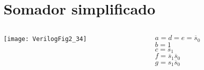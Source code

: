 \section{Somador simplificado} %


\begin{frame}{\insertsection}   \centering
        \begin{columns}
        \begin{column}{0.65\textwidth}
            \texttt{[image: VerilogFig2\_34]}
        \end{column}        
        \begin{column}{0.35\textwidth}
            \pause
            $a = d = e = \overline{s}_0$ \\
            \vspace{0.5cm}
            \pause
            $b = 1$ \\
            \vspace{0.5cm}
            \pause
            $c = \overline{s}_1 $ \\
            \vspace{0.5cm}
            \pause
            $f = \overline{s}_1\overline{s}_0 $ \\
            \vspace{0.5cm}
            \pause
            $g = s_1\overline{s}_0 $ \\
        \end{column}
    \end{columns}
\end{frame}




